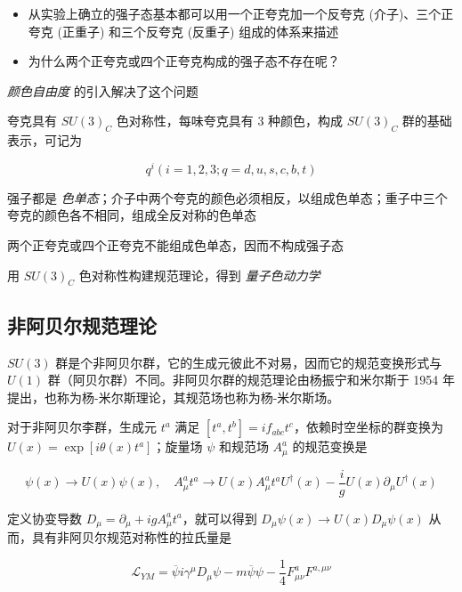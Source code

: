 \documentclass[oneside,a4paper,openany,11pt]{ctexbook}
\begin{document}
\begin{itemize}
    \item 从实验上确立的强子态基本都可以用一个正夸克加一个反夸克 (介子)、三个正夸克 (正重子) 和三个反夸克 (反重子) 组成的体系来描述
    \item 为什么两个正夸克或四个正夸克构成的强子态不存在呢？
\end{itemize}

\emph{颜色自由度} 的引入解决了这个问题

夸克具有 $SU(3)_C$ 色对称性，每味夸克具有 $3$ 种颜色，构成 $SU(3)_C$ 群的基础表示，可记为

\begin{equation}
    q^i (i = 1, 2, 3; q = d, u, s, c, b, t)
\end{equation}

强子都是 \emph{色单态}；介子中两个夸克的颜色必须相反，以组成色单态；重子中三个夸克的颜色各不相同，组成全反对称的色单态

两个正夸克或四个正夸克不能组成色单态，因而不构成强子态

用 $SU(3)_C$ 色对称性构建规范理论，得到 \emph{量子色动力学}

\subsection{非阿贝尔规范理论}

$SU(3)$ 群是个非阿贝尔群，它的生成元彼此不对易，因而它的规范变换形式与 $U(1)$ 群（阿贝尔群）不同。非阿贝尔群的规范理论由杨振宁和米尔斯于 1954 年提出，也称为杨-米尔斯理论，其规范场也称为杨-米尔斯场。

对于非阿贝尔李群，生成元 $t^a$ 满足 $[t^a, t^b] = i f_{abc} t^c$，依赖时空坐标的群变换为 $U(x) = \exp[i\theta(x) t^a]$；旋量场 $\psi$ 和规范场 $A^a_\mu$ 的规范变换是

\begin{equation}
    \psi(x) \to U(x) \psi(x), \quad A_\mu^a t^a \to U(x) A_\mu^a t^a U^\dagger(x) - \frac{i}{g} U(x) \partial_\mu U^\dagger(x)
\end{equation}

定义协变导数 $D_\mu = \partial_\mu + ig A^a_\mu t^a$，就可以得到 $D_\mu \psi(x) \to U(x) D_\mu \psi(x)$ 从而，具有非阿贝尔规范对称性的拉氏量是

\begin{equation}
    \mathcal{L}_{YM} = \overline{\psi} i \gamma^\mu D_\mu \psi - m \overline{\psi} \psi - \frac{1}{4} F_{\mu\nu}^a F^{a,\mu\nu}
\end{equation}
\end{document}
